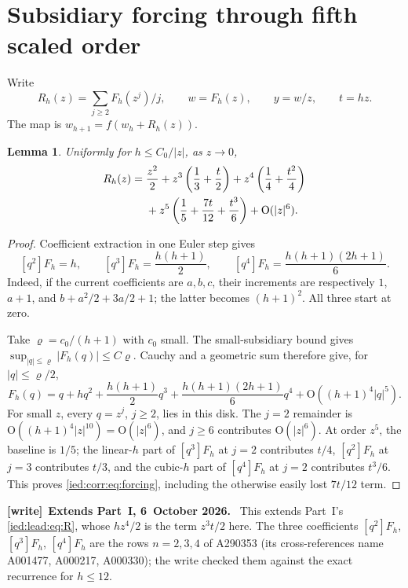 \documentclass[11pt,letterpaper]{article}
\newtheorem{lemma}[theorem]{Lemma}
\theoremstyle{remark}\newtheorem{remark}[theorem]{Remark}
\newcommand{\Oh}{\mathrm O}\newcommand{\supp}{\operatorname{supp}}
\newenvironment{writenote}[1][]{\par\smallskip\begingroup\small
 \noindent\textbf{[write]}\if\relax\detokenize{#1}\relax\else~\textbf{#1.}\fi\ }%
 {\par\endgroup\smallskip}
\begin{document}
\section{Subsidiary forcing through fifth scaled order}\label{ied:corr:sec:forcing}
Write
\[
 R_h(z)=\sum_{j\ge2}F_h(z^j)/j,\qquad w=F_h(z),\qquad y=w/z,\qquad t=hz.
\]
The map is $w_{h+1}=f(w_h+R_h(z))$.
\begin{lemma}\label{ied:corr:lem:forcing}
Uniformly for $h\le C_0/|z|$, as $z\to0$,
\begin{align}\label{ied:corr:eq:forcing}
 R_h(z)={}&\frac{z^2}2+z^3\left(\frac13+\frac t2\right)
 +z^4\left(\frac14+\frac{t^2}4\right)\\
 &+z^5\left(\frac15+\frac{7t}{12}+\frac{t^3}6\right)+\Oh(|z|^6).\notag
\end{align}
\end{lemma}
\begin{proof}
Coefficient extraction in one Euler step gives
\[
 [q^2]F_h=h,\qquad [q^3]F_h=\frac{h(h+1)}2,\qquad
 [q^4]F_h=\frac{h(h+1)(2h+1)}6.
\]
Indeed, if the current coefficients are $a,b,c$, their increments are respectively $1$, $a+1$, and $b+a^2/2+3a/2+1$; the latter becomes $(h+1)^2$. All three start at zero.

Take $\varrho=c_0/(h+1)$ with $c_0$ small. The small-subsidiary bound gives $\sup_{|q|\le\varrho}|F_h(q)|\le C\varrho$. Cauchy and a geometric sum therefore give, for $|q|\le\varrho/2$,
\begin{equation}\label{ied:corr:eq:subsidiarytail}
 F_h(q)=q+hq^2+\frac{h(h+1)}2q^3+
 \frac{h(h+1)(2h+1)}6q^4+\Oh((h+1)^4|q|^5).
\end{equation}
For small $z$, every $q=z^j$, $j\ge2$, lies in this disk. The $j=2$ remainder is $\Oh((h+1)^4|z|^{10})=\Oh(|z|^6)$, and $j\ge6$ contributes $\Oh(|z|^6)$. At order $z^5$, the baseline is $1/5$; the linear-$h$ part of $[q^3]F_h$ at $j=2$ contributes $t/4$, $[q^2]F_h$ at $j=3$ contributes $t/3$, and the cubic-$h$ part of $[q^4]F_h$ at $j=2$ contributes $t^3/6$. This proves \eqref{ied:corr:eq:forcing}, including the otherwise easily lost $7t/12$ term.
\end{proof}

\begin{writenote}[Extends Part~I, 6~October 2026]
This extends Part~I's \eqref{ied:lead:eq:R}, whose $hz^4/2$ is the term $z^3t/2$ here. The three coefficients $[q^2]F_h$, $[q^3]F_h$, $[q^4]F_h$ are the rows $n=2,3,4$ of A290353 (its cross-references name A001477, A000217, A000330); the write checked them against the exact recurrence for $h\le12$.
\end{writenote}
\end{document}
